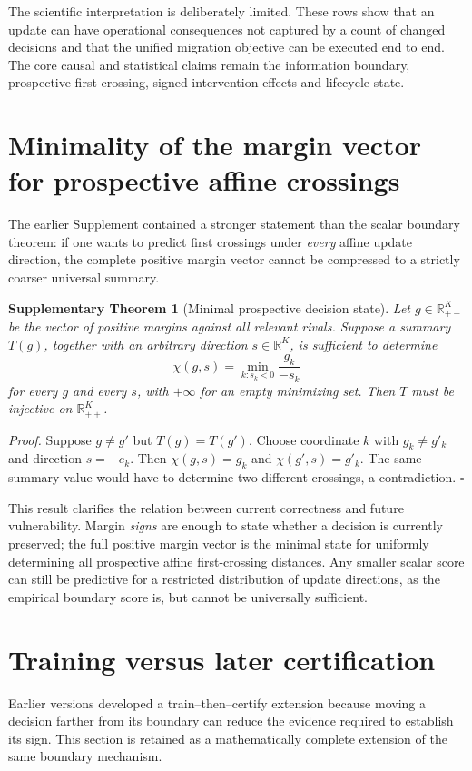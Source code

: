 \documentclass[11pt,letterpaper]{article}
\theoremstyle{plain}
\newtheorem{theorem}{Supplementary Theorem}
\newcommand{\1}{\mathbf 1}
\begin{document}
The scientific interpretation is deliberately limited. These rows show that an update can have operational consequences not captured by a count of changed decisions and that the unified migration objective can be executed end to end. The core causal and statistical claims remain the information boundary, prospective first crossing, signed intervention effects and lifecycle state.




\section{Minimality of the margin vector for prospective affine crossings}
The earlier Supplement contained a stronger statement than the scalar boundary theorem: if one wants to predict first crossings under \emph{every} affine update direction, the complete positive margin vector cannot be compressed to a strictly coarser universal summary.

\begin{theorem}[Minimal prospective decision state]
Let $g\in\mathbb R_{++}^K$ be the vector of positive margins against all relevant rivals. Suppose a summary $T(g)$, together with an arbitrary direction $s\in\mathbb R^K$, is sufficient to determine
\begin{equation}
 \chi(g,s)=\min_{k:s_k<0}\frac{g_k}{-s_k}
\label{eq:s_minimal_summary_cross}
\end{equation}
for every $g$ and every $s$, with $+\infty$ for an empty minimizing set. Then $T$ must be injective on $\mathbb R_{++}^K$.
\end{theorem}
\textit{Proof.} Suppose $g\neq g'$ but $T(g)=T(g')$. Choose coordinate $k$ with $g_k\neq g'_k$ and direction $s=-e_k$. Then $\chi(g,s)=g_k$ and $\chi(g',s)=g'_k$. The same summary value would have to determine two different crossings, a contradiction. $\square$

This result clarifies the relation between current correctness and future vulnerability. Margin \emph{signs} are enough to state whether a decision is currently preserved; the full positive margin vector is the minimal state for uniformly determining all prospective affine first-crossing distances. Any smaller scalar score can still be predictive for a restricted distribution of update directions, as the empirical boundary score is, but cannot be universally sufficient.

\section{Training versus later certification}
Earlier versions developed a train--then--certify extension because moving a decision farther from its boundary can reduce the evidence required to establish its sign. This section is retained as a mathematically complete extension of the same boundary mechanism.
\end{document}
